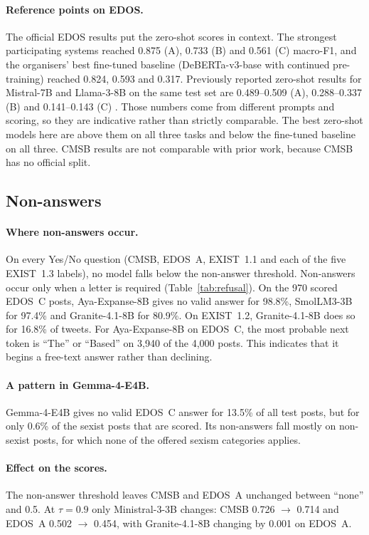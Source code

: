 \documentclass[11pt]{article}
\newcommand{\tbl}[1]{}
\begin{document}
\paragraph{Reference points on EDOS.} The official EDOS results \citep{kirk2023semeval} put the zero-shot scores in context. The strongest participating systems reached 0.875 (A), 0.733 (B) and 0.561 (C) macro-F1, and the organisers' best fine-tuned baseline (DeBERTa-v3-base with continued pre-training) reached 0.824, 0.593 and 0.317. Previously reported zero-shot results for Mistral-7B and Llama-3-8B on the same test set are 0.489--0.509 (A), 0.288--0.337 (B) and 0.141--0.143 (C) \citep{riahisamani2025rlhf}. Those numbers come from different prompts and scoring, so they are indicative rather than strictly comparable. The best zero-shot models here are above them on all three tasks and below the fine-tuned baseline on all three. CMSB results are not comparable with prior work, because CMSB has no official split.

\subsection{Non-answers}\label{sec:nonanswers}
\tbl{refusal}

\paragraph{Where non-answers occur.} On every Yes/No question (CMSB, EDOS~A, EXIST~1.1 and each of the five EXIST~1.3 labels), no model falls below the non-answer threshold. Non-answers occur only when a letter is required (Table~\ref{tab:refusal}). On the 970 scored EDOS~C posts, Aya-Expanse-8B gives no valid answer for 98.8\%, SmolLM3-3B for 97.4\% and Granite-4.1-8B for 80.9\%. On EXIST~1.2, Granite-4.1-8B does so for 16.8\% of tweets. For Aya-Expanse-8B on EDOS~C, the most probable next token is ``The'' or ``Based'' on 3{,}940 of the 4{,}000 posts. This indicates that it begins a free-text answer rather than declining.

\paragraph{A pattern in Gemma-4-E4B.} Gemma-4-E4B gives no valid EDOS~C answer for 13.5\% of all test posts, but for only 0.6\% of the sexist posts that are scored. Its non-answers fall mostly on non-sexist posts, for which none of the offered sexism categories applies.

\paragraph{Effect on the scores.} The non-answer threshold leaves CMSB and EDOS~A unchanged between ``none'' and 0.5. At $\tau = 0.9$ only Ministral-3-3B changes: CMSB 0.726 $\to$ 0.714 and EDOS~A 0.502 $\to$ 0.454, with Granite-4.1-8B changing by 0.001 on EDOS~A.
\end{document}
